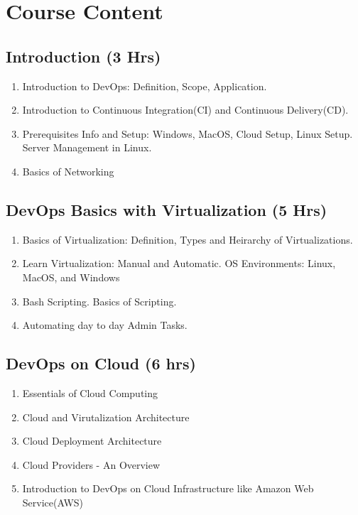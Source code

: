 \section{Course Content}
\noindent
\subsection{Introduction \hfill (3 Hrs)} 

\begin{enumerate}
    \item Introduction to DevOps: Definition, Scope, Application.
    \item Introduction to Continuous Integration(CI) and Continuous Delivery(CD).
    \item Prerequisites Info and Setup:  Windows, MacOS, Cloud Setup, Linux Setup. Server Management in Linux. 
    \item Basics of Networking
\end{enumerate}

\subsection{DevOps Basics with Virtualization \hfill (5 Hrs)} 

\begin{enumerate}
    \item Basics of Virtualization: Definition, Types and Heirarchy of Virtualizations.
    \item Learn Virtualization: Manual and Automatic. OS Environments: Linux, MacOS, and Windows
    \item Bash Scripting. Basics of Scripting.
    \item Automating day to day Admin Tasks.
    
\end{enumerate}

\subsection{DevOps on Cloud \hfill (6 hrs)} 

\begin{enumerate}
    \item Essentials of Cloud Computing
    \item Cloud and Virutalization Architecture
    \item Cloud Deployment Architecture
    \item Cloud Providers - An Overview
    \item Introduction to DevOps on Cloud Infrastructure like Amazon Web Service(AWS)
    
\end{enumerate}

